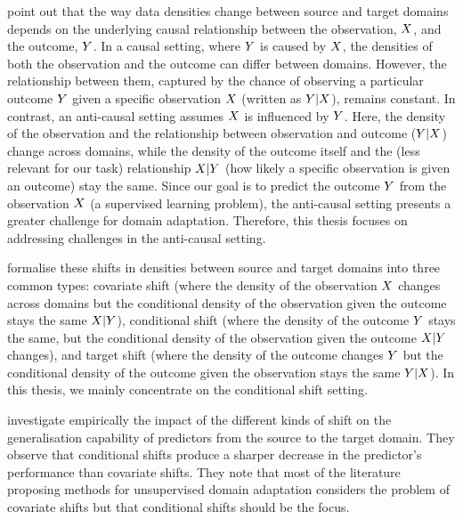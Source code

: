 \documentclass[../thesis.tex]{subfiles}
\begin{document}
\citet{scholkopfCausalAnticausalLearning2012} point out that the way data densities change between source and target domains depends on the underlying causal relationship between the observation, $\myrv{x}$, and the outcome, $\myrv{y}$. In a causal setting, where $\myrv{y}$ is caused by $\myrv{x}$, the densities of both the observation and the outcome can differ between domains. However, the relationship between them, captured by the chance of observing a particular outcome $\myrv{y}$ given a specific observation $\myrv{x}$ (written as $\myrv{y} | \myrv{x}$), remains constant. In contrast, an anti-causal setting assumes $\myrv{x}$ is influenced by $\myrv{y}$. Here, the density of the observation and the relationship between observation and outcome ($\myrv{y} | \myrv{x}$) change across domains, while the density of the outcome itself and the (less relevant for our task) relationship $\myrv{x} | \myrv{y}$ (how likely a specific observation is given an outcome) stay the same. Since our goal is to predict the outcome $\myrv{y}$ from the observation $\myrv{x}$ (a supervised learning problem), the anti-causal setting presents a greater challenge for domain adaptation. Therefore, this thesis focuses on addressing challenges in the anti-causal setting.

\citet{zhangDomainAdaptationTarget2013} formalise these shifts in densities between source and target domains into three common types: covariate shift (where the density of the observation $\myrv{x}$ changes across domains but the conditional density of the observation given the outcome stays the same $\myrv{x} | \myrv{y}$), conditional shift (where the density of the outcome $\myrv{y}$ stays the same, but the conditional density of the observation given the outcome $\myrv{x} | \myrv{y}$ changes), and target shift (where the density of the outcome changes $\myrv{y}$ but the conditional density of the outcome given the observation stays the same $\myrv{y} | \myrv{x}$). In this thesis, we mainly concentrate on the conditional shift setting. 

\citet{liuNeedLanguageDescribing2023} investigate empirically the impact of the different kinds of shift on the generalisation capability of predictors from the source to the target domain. They observe that conditional shifts produce a sharper decrease in the predictor's performance than covariate shifts. They note that most of the literature proposing methods for unsupervised domain adaptation considers the problem of covariate shifts but that conditional shifts should be the focus.
\end{document}
